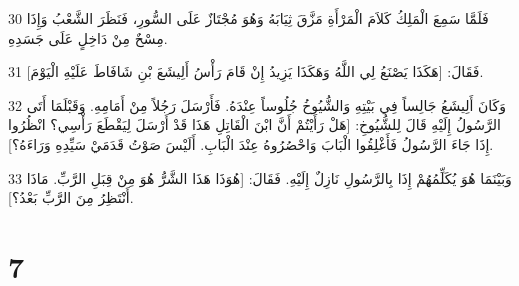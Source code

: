 \par 30 فَلَمَّا سَمِعَ الْمَلِكُ كَلاَمَ الْمَرْأَةِ مَزَّقَ ثِيَابَهُ وَهُوَ مُجْتَازٌ عَلَى السُّورِ، فَنَظَرَ الشَّعْبُ وَإِذَا مِسْحٌ مِنْ دَاخِلٍ عَلَى جَسَدِهِ.
\par 31 فَقَالَ: [هَكَذَا يَصْنَعُ لِي اللَّهُ وَهَكَذَا يَزِيدُ إِنْ قَامَ رَأْسُ أَلِيشَعَ بْنِ شَافَاطَ عَلَيْهِ الْيَوْمَ].
\par 32 وَكَانَ أَلِيشَعُ جَالِساً فِي بَيْتِهِ وَالشُّيُوخُ جُلُوساً عِنْدَهُ. فَأَرْسَلَ رَجُلاً مِنْ أَمَامِهِ. وَقَبْلَمَا أَتَى الرَّسُولُ إِلَيْهِ قَالَ لِلشُّيُوخِ: [هَلْ رَأَيْتُمْ أَنَّ ابْنَ الْقَاتِلِ هَذَا قَدْ أَرْسَلَ لِيَقْطَعَ رَأْسِي؟ انْظُرُوا إِذَا جَاءَ الرَّسُولُ فَأَغْلِقُوا الْبَابَ وَاحْصُرُوهُ عِنْدَ الْبَابِ. أَلَيْسَ صَوْتُ قَدَمَيْ سَيِّدِهِ وَرَاءَهُ؟].
\par 33 وَبَيْنَمَا هُوَ يُكَلِّمُهُمْ إِذَا بِالرَّسُولِ نَازِلٌ إِلَيْهِ. فَقَالَ: [هُوَذَا هَذَا الشَّرُّ هُوَ مِنْ قِبَلِ الرَّبِّ. مَاذَا أَنْتَظِرُ مِنَ الرَّبِّ بَعْدُ؟].

\chapter{7}

